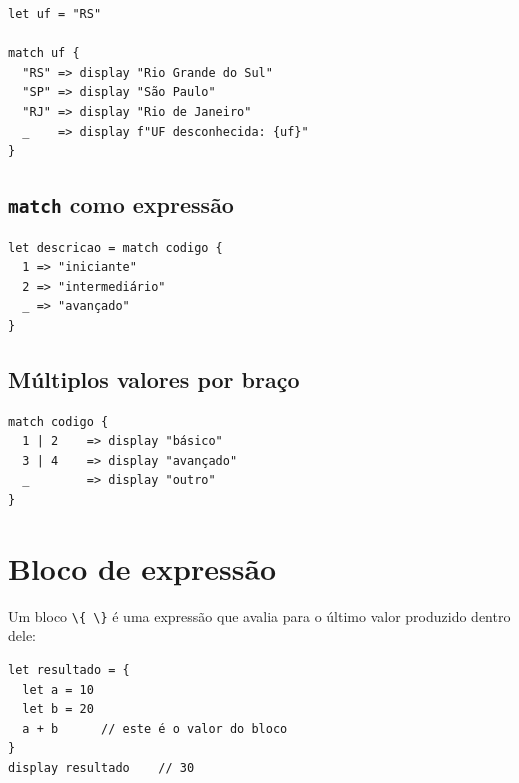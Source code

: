 \begin{lstlisting}
let uf = "RS"

match uf {
  "RS" => display "Rio Grande do Sul"
  "SP" => display "São Paulo"
  "RJ" => display "Rio de Janeiro"
  _    => display f"UF desconhecida: {uf}"
}
\end{lstlisting}

\subsection*{\texttt{match} como expressão}

\begin{lstlisting}
let descricao = match codigo {
  1 => "iniciante"
  2 => "intermediário"
  _ => "avançado"
}
\end{lstlisting}

\subsection*{Múltiplos valores por braço}

\begin{lstlisting}
match codigo {
  1 | 2    => display "básico"
  3 | 4    => display "avançado"
  _        => display "outro"
}
\end{lstlisting}

\section{Bloco de expressão}

Um bloco \lstinline|\{ \}| é uma expressão que avalia para o último valor produzido
dentro dele:

\begin{lstlisting}
let resultado = {
  let a = 10
  let b = 20
  a + b      // este é o valor do bloco
}
display resultado    // 30
\end{lstlisting}
